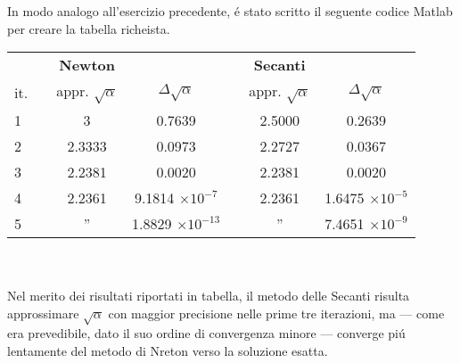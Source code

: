 \begin{center}
\footnotesize\noindent{}\end{center}

\noindent In modo analogo all'esercizio precedente, \'e stato scritto il seguente codice Matlab per creare la tabella richeista.
\\



\begin{tabular}{l*{6}{c}}
 & \vline& \textbf{Newton} & & \vline& \textbf{Secanti}\\
 it. & \vline& appr. \(\sqrt\alpha \) & \(\Delta\sqrt\alpha \) & \vline& appr. \(\sqrt\alpha \) & \(\Delta\sqrt\alpha \) \\
\hline
 1 & \vline& 3      & 0.7639				& \vline& 2.5000 & 0.2639 \\
 2 & \vline& 2.3333 & 0.0973				& \vline& 2.2727 & 0.0367 \\
 3 & \vline& 2.2381 & 0.0020				& \vline& 2.2381 & 0.0020 \\
 4 & \vline& 2.2361 & 9.1814 \(\times10^{-7}\) 	& \vline& 2.2361 & 1.6475 \(\times10^{-5}\) \\
 5 & \vline& ''     & 1.8829 \(\times10^{-13}\)	& \vline& ''     & 7.4651 \(\times10^{-9}\) \\

\end{tabular} \\
\\

\noindent Nel merito dei risultati riportati in tabella, il metodo delle Secanti risulta approssimare \(\sqrt\alpha \) con maggior precisione nelle prime tre iterazioni, ma --- come era prevedibile, dato il suo ordine di convergenza minore --- converge pi\'u lentamente del metodo di Nreton verso la soluzione esatta.

